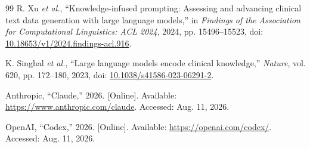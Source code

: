 \documentclass[conference]{IEEEtran}
\begin{document}
\begin{thebibliography}{99}
R. Xu \emph{et al.}, ``Knowledge-infused prompting: Assessing and advancing
clinical text data generation with large language models,'' in \emph{Findings
of the Association for Computational Linguistics: ACL 2024}, 2024,
pp. 15496--15523, doi:
\href{https://doi.org/10.18653/v1/2024.findings-acl.916}{10.18653/v1/2024.findings-acl.916}.

K. Singhal \emph{et al.}, ``Large language models encode clinical knowledge,''
\emph{Nature}, vol. 620, pp. 172--180, 2023, doi:
\href{https://doi.org/10.1038/s41586-023-06291-2}{10.1038/s41586-023-06291-2}.

Anthropic, ``Claude,'' 2026. [Online]. Available:
\url{https://www.anthropic.com/claude}. Accessed: Aug. 11, 2026.

OpenAI, ``Codex,'' 2026. [Online]. Available:
\url{https://openai.com/codex/}. Accessed: Aug. 11, 2026.

\end{thebibliography}
\end{document}

